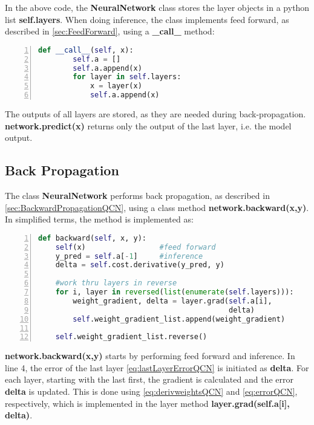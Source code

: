 In the above code, the \textbf{NeuralNetwork} class stores the layer objects in a python list \textbf{self.layers}. When doing inference, the class implements feed forward, as described in \autoref{sec:FeedForward}, using a \textbf{\_call\_} method:
\begin{lstlisting}[language=python, numbers=left]
def __call__(self, x):
        self.a = []
        self.a.append(x)
        for layer in self.layers:
            x = layer(x)
            self.a.append(x)
\end{lstlisting}
The outputs of all layers are stored, as they are needed during back-propagation. \textbf{network.predict(x)} returns only the output of the last layer, i.e. the model output. 

\subsection{Back Propagation}\label{sec:BackpropImplementation}

The class \textbf{NeuralNetwork} performs back propagation, as described in \autoref{sec:BackwardPropagationQCN}, using a class method \textbf{network.backward(x,y)}. In simplified terms, the method is implemented as:
\begin{lstlisting}[language=python, numbers=left]
def backward(self, x, y):
    self(x)                 #feed forward      
    y_pred = self.a[-1]     #inference
    delta = self.cost.derivative(y_pred, y)

    #work thru layers in reverse
    for i, layer in reversed(list(enumerate(self.layers))):
        weight_gradient, delta = layer.grad(self.a[i], 
                                            delta)
        self.weight_gradient_list.append(weight_gradient)

    self.weight_gradient_list.reverse()
\end{lstlisting}
\textbf{network.backward(x,y)} starts by performing feed forward and inference. In line 4, the error of the last layer \autoref{eq:lastLayerErrorQCN} is initiated as \textbf{delta}. For each layer, starting with the last first, the gradient is calculated and the error \textbf{delta} is updated. This is done using \autoref{eq:derivweightsQCN} and \autoref{eq:errorQCN}, respectively, which is implemented in the layer method \textbf{layer.grad(self.a[i], delta)}.

